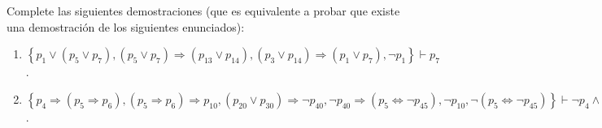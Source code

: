 \documentclass[12pt]{report}
\newcounter{it}
\theoremstyle{largebreak}
\begin{document}
    \begin{excer}
        Complete las siguientes demostraciones (que es equivalente a probar que existe una demostración de los siguientes enunciados):
        \begin{enumerate}
            \item $\left\{p_1\lor(p_5\lor p_7),(p_5\lor p_7)\Rightarrow(p_{13}\lor p_{14}),(p_3\lor p_{14})\Rightarrow(p_1\lor p_7),\neg p_1 \right\}\vdash p_7$.
            \item $\left\{p_4\Rightarrow(p_5\Rightarrow p_6),(p_5\Rightarrow p_6)\Rightarrow p_{10},(p_{20}\lor p_{ 30})\Rightarrow \neg p_{ 40}, \neg p_{ 40}\Rightarrow( p_5\iff \neg p_{ 45}),\neg p_{10},\neg(p_5\iff\neg p_{45}) \right\}\vdash \neg p_4\land(p_{20}\lor p_{30})$.
        \end{enumerate}
    \end{excer}
\end{document}

